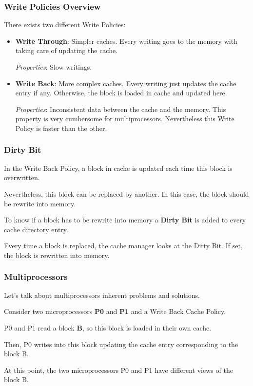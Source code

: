 
\begin{frame}
  \frametitle{Write Policies Overview}

  There exists two different Write Policies:

  \begin{itemize}[<+->]
    \item
      \textbf{Write Through}: Simpler caches. Every writing goes to the
      memory with taking care of updating the cache.

      \textit{Properties}: Slow writings.
    \item
      \textbf{Write Back}: More complex caches. Every writing just updates
      the cache entry if any. Otherwise, the block is loaded in cache
      and updated here.

      \textit{Properties}: Inconsistent data between the cache and the memory.
      This property is very cumbersome for multiprocessors. Nevertheless this
      Write Policy is faster than the other.
  \end{itemize}
\end{frame}


\begin{frame}
  \frametitle{Dirty Bit}

  In the Write Back Policy, a block in cache is updated each time this
  block is overwritten.

  \nl

  Nevertheless, this block can be replaced by another. In this case, the
  block should be rewrite into memory.

  \nl

  To know if a block has to be rewrite into memory a \textbf{Dirty Bit} is
  added to every cache directory entry.

  \nl

  Every time a block is replaced, the cache manager looks at the Dirty Bit.
  If set, the block is rewritten into memory.
\end{frame}


\begin{frame}
  \frametitle{Multiprocessors}

  Let's talk about multiprocessors inherent problems and solutions.

  \nl

  Consider two microprocessors \textbf{P0} and \textbf{P1} and a Write
  Back Cache Policy.

  \nl

  P0 and P1 read a block \textbf{B}, so this block is loaded in their
  own cache.

  \nl

  Then, P0 writes into this block updating the cache entry corresponding to
  the block B.

  \nl

  At this point, the two microprocessors P0 and P1 have different
  views of the block B.
\end{frame}

